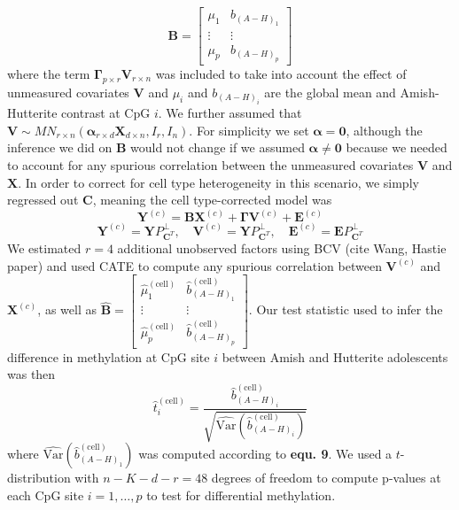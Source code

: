 \documentclass{article}
\begin{document}
\begin{equation}
\bm{B} = \left[ \begin{matrix}
\mu_1 & b_{(A-H)_1}\\
\vdots & \vdots\\
\mu_p & b_{(A-H)_p}
\end{matrix} \right]
\end{equation}
where the term $\bm{\Gamma}_{p \times r}\bm{V}_{r \times n}$ was included to take into account the effect of unmeasured covariates $\bm{V}$ and $\mu_i$ and $b_{(A-H)_i}$ are the global mean and Amish-Hutterite contrast at CpG $i$. We further assumed that $\bm{V} \sim MN_{r \times n}\left( \bm{\alpha}_{r \times d}\bm{X}_{d \times n}, I_r, I_n \right)$. For simplicity we set $\bm{\alpha} = \bm{0}$, although the inference we did on $\bm{B}$ would not change if we assumed $\bm{\alpha} \neq \bm{0}$ because we needed to account for any spurious correlation between the unmeasured covariates $\bm{V}$ and $\bm{X}$. In order to correct for cell type heterogeneity in this scenario, we simply regressed out $\bm{C}$, meaning the cell type-corrected model was
\begin{equation}
\bm{Y}^{(c)} = \bm{B}\bm{X}^{(c)} + \bm{\Gamma}\bm{V}^{(c)} + \bm{E}^{(c)}
\end{equation}
\begin{equation}
\bm{Y}^{(c)} = \bm{Y}P_{\bm{C}^T}^{\perp}, \quad \bm{V}^{(c)} = \bm{Y}P_{\bm{C}^T}^{\perp}, \quad \bm{E}^{(c)} = \bm{E}P_{\bm{C}^T}^{\perp}
\end{equation}
We estimated $r=4$ additional unobserved factors using BCV (cite Wang, Hastie paper) and used CATE to compute any spurious correlation between $\bm{V}^{(c)}$ and $\bm{X}^{(c)}$, as well as $\hat{\bm{B}} = \left[ \begin{matrix}
\hat{\mu}_1^{(\text{cell})} & \hat{b}_{(A-H)_1}^{(\text{cell})}\\
\vdots & \vdots\\
\hat{\mu}_p^{(\text{cell})} & \hat{b}_{(A-H)_p}^{(\text{cell})}
\end{matrix} \right]$. Our test statistic used to infer the difference in methylation at CpG site $i$ between Amish and Hutterite adolescents was then
\begin{equation}
\hat{t}_i^{(\text{cell})} = \frac{\hat{b}_{(A-H)_i}^{(\text{cell})}}{\sqrt{\hat{\text{Var}}\left( \hat{b}_{(A-H)_i}^{(\text{cell})} \right)}}
\end{equation}
where $\hat{\text{Var}}\left(\hat{b}_{(A-H)_1}^{(\text{cell})} \right)$ was computed according to \textbf{equ. 9}. We used a $t$-distribution with $n - K - d - r = 48$ degrees of freedom to compute p-values at each CpG site $i = 1, \ldots, p$ to test for differential methylation.\\ 
\end{document}

